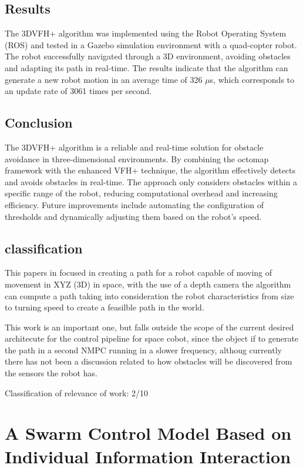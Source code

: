 \documentclass[a4paper,12pt]{article}
\begin{document}
    \subsection{Results}
    The 3DVFH+ algorithm was implemented using the Robot Operating System (ROS) and tested in a Gazebo simulation environment with a quad-copter robot. The robot successfully navigated through a 3D environment, avoiding obstacles and adapting its path in real-time. The results indicate that the algorithm can generate a new robot motion in an average time of 326 $\mu$s, which corresponds to an update rate of 3061 times per second.
    
    \subsection{Conclusion}
    The 3DVFH+ algorithm is a reliable and real-time solution for obstacle avoidance in three-dimensional environments. By combining the octomap framework with the enhanced VFH+ technique, the algorithm effectively detects and avoids obstacles in real-time. The approach only considers obstacles within a specific range of the robot, reducing computational overhead and increasing efficiency. Future improvements include automating the configuration of thresholds and dynamically adjusting them based on the robot's speed.
    
    \subsection{classification}
    
    This papers in focused in creating a path for a robot capable of moving of movement in XYZ (3D) in space, with the use of a depth camera the algorithm can compute a path taking into consideration the robot characteristics from size to turning speed to create a feasilble path in the world.

    This work is an important one, but falls outside the scope of the current desired architecute for the control pipeline for space cobot, since the object if to generate the path in a second NMPC running in a slower frequency, althoug currently there has not been a discussion related to how obstacles will be discovered from the sensors the robot has.

    Classification of relevance of work: 2/10

\section{A Swarm Control Model Based on Individual
Information Interaction}
\end{document}

